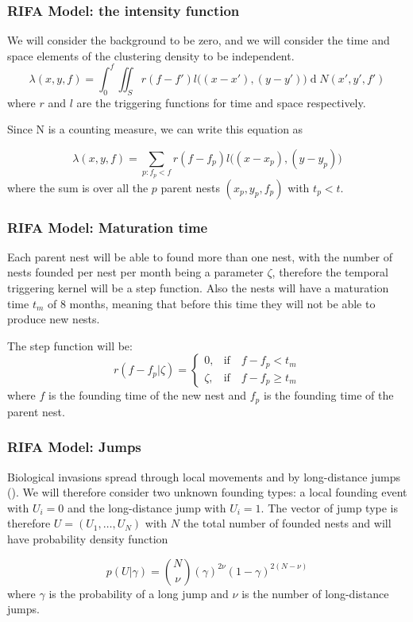 \documentclass[9pt, xcolor={dvipsnames,svgnames,table}]{beamer}
\renewcommand{\d}[1]{\ensuremath{\operatorname{d}\!{#1}}}
\begin{document}
\begin{frame}
    \frametitle{RIFA Model: the intensity function}
    We will consider the background to be zero, and we will consider the time and space elements of the clustering density to be independent.
    \begin{equation*}
        \lambda(x, y, f) = \int_{0}^{f} \iint_{S} r(f-f') l\Big((x - x'), (y - y')\Big) \d N(x', y', f')
    \end{equation*}
    where $r$ and $l$ are the triggering functions for time and space respectively.

    Since N is a counting measure, we can write this equation as

    \begin{equation*}
        \lambda(x, y, f) = \sum_{ p: f_p < f } r(f - f_p) l \Big((x - x_p),(y - y_p) \Big)
    \end{equation*}
    where the sum is over all the $p$ parent nests $(x_p, y_p, f_p)$ with $t_p < t$.
\end{frame}





\begin{frame}
\frametitle{RIFA Model: Maturation time}
    Each parent nest will be able to found more than one nest, with the number of nests founded per nest per month being a parameter $\zeta$, therefore the temporal triggering kernel will be a step function. Also the nests will have a maturation time $t_m$ of 8 months, meaning that before this time they will not be able to produce new nests. 

    The step function will be:
    \begin{equation*}
        r (f - f_p | \zeta) =
        \begin{cases}
            0, & \mbox{if} \quad f - f_p < t_{m} \\
            \zeta, & \mbox{if} \quad f - f_p \geq t_{m}
        \end{cases}
    \end{equation*}
    where $f$ is the founding time of the new nest and $f_p$ is the founding time of the parent nest.
\end{frame}





\begin{frame}
\frametitle{RIFA Model: Jumps}
    Biological invasions spread through \textcolor{PineGreen}{local movements} and by \textcolor{PineGreen}{long-distance jumps (\cite{Suarez})}. We will therefore consider two unknown founding types: a local founding event with $U_i = 0$ and the long-distance jump with $U_i = 1$. The vector of jump type is therefore $U = (U_1, \dots, U_N)$ with $N$ the total number of founded nests and will have probability density function

    \begin{equation*}
        p(U| \gamma ) = {N \choose \nu}(\gamma)^{2\nu}(1 - \gamma)^{2(N - \nu)}
    \end{equation*}
    where $\gamma$ is the probability of a long jump and $\nu$ is the number of long-distance jumps.
\end{frame}
\end{document}
